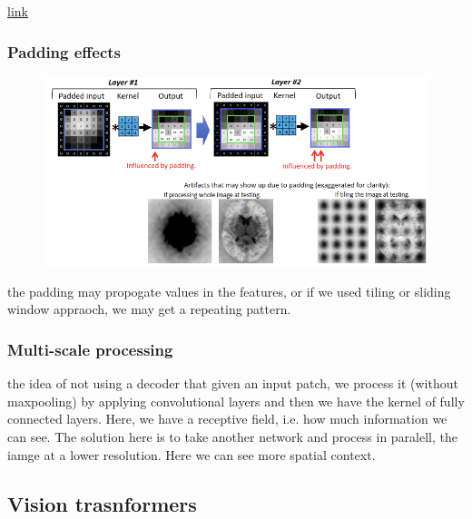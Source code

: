 \documentclass[11pt]{article}
\begin{document}
\href{https://arxiv.org/abs/1606.00915}{link}

\subsubsection{Padding effects}

\begin{figure}[H]
    \centering
    \includegraphics[width=.8\linewidth]{figures/padding-effects.png}
\end{figure}

the padding may propogate values in the features, or if we used tiling or sliding window appraoch, we may get a repeating pattern.

\subsubsection{Multi-scale processing}

\begin{figure}[H]
    \centering
\end{figure}

the idea of not using a decoder that given an input patch, we process it (without maxpooling) by applying convolutional layers and then we have the kernel of fully connected layers. Here, we have a receptive field, i.e. how much information we can see. The solution here is to take another network and process in paralell, the iamge at a lower resolution. Here we can see more spatial context.

\begin{figure}[H]
    \centering
\end{figure}

\subsection{Vision trasnformers}
\end{document}
